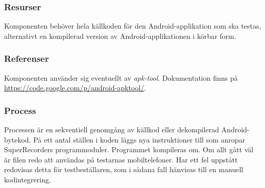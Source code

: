 \subsubsection{Resurser}
Komponenten behöver hela källkoden för den Android-applikation som ska testas, alternativt en kompilerad version av Android-applikationen i körbar form.

\subsubsection{Referenser}
Komponenten använder sig eventuellt av \textit{apk-tool}. Dokumentation finns på \url{https://code.google.com/p/android-apktool/}.

\subsubsection{Process}
Processen är en sekventiell genomgång av källkod eller dekompilerad Android-bytekod. På ett antal ställen i koden läggs nya instruktioner till som anropar SuperRecorders programmoduler. Programmet kompileras om. Om allt gått väl är filen redo att användas på testarnas mobiltelefoner. Har ett fel uppstått redovisas detta för testbeställaren, som i sådana fall hänvisas till en manuell kodintegrering.

